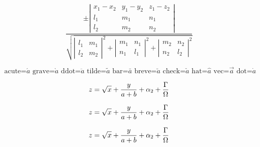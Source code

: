 \documentclass{article}
\begin{document}
\begin{displaymath}
\frac{\pm
\left|\begin{array}{ccc}
x_1-x_2  & y_1-y_2 & z_1-z_2 \\
l_1      & m_1     & n_1     \\
l_2      & m_2     & n_2
\end{array}\right|}{
\sqrt{\left|\begin{array}{cc}l_1&m_1\\
l_2&m_2\end{array}\right|^2
+     \left|\begin{array}{cc}m_1&n_1\\
n_1&l_1\end{array}\right|^2
+     \left|\begin{array}{cc}m_2&n_2\\
n_2&l_2\end{array}\right|^2}}
\end{displaymath}

\begin{displaymath}
\mbox{ acute=}\acute{a}
\mbox{ grave=}\grave{a}
\mbox{ ddot=}\ddot {a}
\mbox{ tilde=}\tilde{a}
\mbox{ bar=}\bar  {a}
\mbox{ breve=}\breve{a}
\mbox{ check=}\check{a}
\mbox{ hat=}\hat  {a}
\mbox{ vec=}\vec  {a}
\mbox{ dot=}\dot  {a}
\end{displaymath}

$$z=\sqrt{x}+{y\over a+b} + \alpha_2+{\Gamma\over\Omega}$$

\boldmath

$$z=\sqrt{x}+{y\over a+b} + \alpha_2+{\Gamma\over\Omega}$$

\unboldmath

$$z=\sqrt{x}+{y\over a+b} + \alpha_2+{\Gamma\over\Omega}$$
\end{document}
